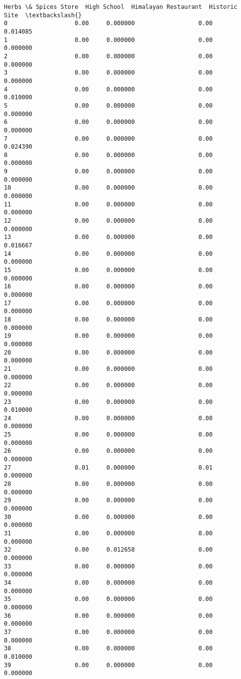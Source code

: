 \documentclass[11pt]{article}
\begin{document}
\begin{tcolorbox}[breakable, size=fbox, boxrule=.5pt, pad at break*=1mm, opacityfill=0]
\begin{Verbatim}[commandchars=\\\{\}]
    Herbs \& Spices Store  High School  Himalayan Restaurant  Historic Site  \textbackslash{}
0                   0.00     0.000000                  0.00       0.014085
1                   0.00     0.000000                  0.00       0.000000
2                   0.00     0.000000                  0.00       0.000000
3                   0.00     0.000000                  0.00       0.000000
4                   0.00     0.000000                  0.00       0.010000
5                   0.00     0.000000                  0.00       0.000000
6                   0.00     0.000000                  0.00       0.000000
7                   0.00     0.000000                  0.00       0.024390
8                   0.00     0.000000                  0.00       0.000000
9                   0.00     0.000000                  0.00       0.000000
10                  0.00     0.000000                  0.00       0.000000
11                  0.00     0.000000                  0.00       0.000000
12                  0.00     0.000000                  0.00       0.000000
13                  0.00     0.000000                  0.00       0.016667
14                  0.00     0.000000                  0.00       0.000000
15                  0.00     0.000000                  0.00       0.000000
16                  0.00     0.000000                  0.00       0.000000
17                  0.00     0.000000                  0.00       0.000000
18                  0.00     0.000000                  0.00       0.000000
19                  0.00     0.000000                  0.00       0.000000
20                  0.00     0.000000                  0.00       0.000000
21                  0.00     0.000000                  0.00       0.000000
22                  0.00     0.000000                  0.00       0.000000
23                  0.00     0.000000                  0.00       0.010000
24                  0.00     0.000000                  0.00       0.000000
25                  0.00     0.000000                  0.00       0.000000
26                  0.00     0.000000                  0.00       0.000000
27                  0.01     0.000000                  0.01       0.000000
28                  0.00     0.000000                  0.00       0.000000
29                  0.00     0.000000                  0.00       0.000000
30                  0.00     0.000000                  0.00       0.000000
31                  0.00     0.000000                  0.00       0.000000
32                  0.00     0.012658                  0.00       0.000000
33                  0.00     0.000000                  0.00       0.000000
34                  0.00     0.000000                  0.00       0.000000
35                  0.00     0.000000                  0.00       0.000000
36                  0.00     0.000000                  0.00       0.000000
37                  0.00     0.000000                  0.00       0.000000
38                  0.00     0.000000                  0.00       0.010000
39                  0.00     0.000000                  0.00       0.000000


\end{Verbatim}
\end{tcolorbox}
\end{document}
